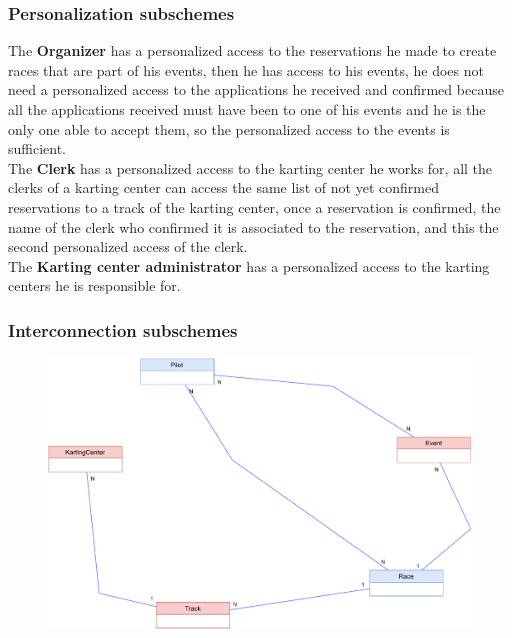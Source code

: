 \documentclass{beamer}
\begin{document}
\begin{frame}
    \frametitle{Personalization subschemes}
    \scriptsize
    The \textbf{Organizer} has a personalized access to the reservations he made to create races that are part of his events,
    then he has access to his events, he does not need a personalized access to the applications he received and confirmed
    because all the applications received must have been to one of his events and he is the only one able to accept them,
    so the personalized access to the events is sufficient.\\
    The \textbf{Clerk} has a personalized access to the karting center he works for, all the clerks of a karting center can 
    access the same list of not yet confirmed reservations to a track of the karting center, once a reservation is confirmed, the name of the clerk who confirmed it
    is associated to the reservation, and this the second personalized access of the clerk.\\
    The \textbf{Karting center administrator} has a personalized access to the karting centers he is responsible for.
\end{frame}


\begin{frame}
    \frametitle{Interconnection subschemes}
    \begin{figure}
        \centering
        \includegraphics[width=1\linewidth]{drawio/interconnection-subschemes-cropped.pdf}
    \end{figure}
\end{frame}
\end{document}
